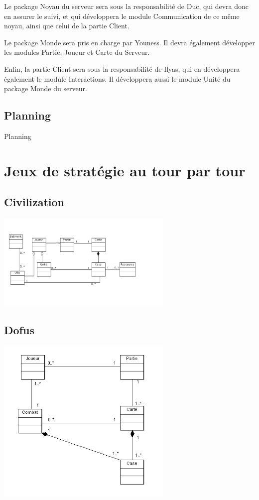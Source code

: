 \documentclass[a4paper,10pt]{report}
\begin{document}
      Le package Noyau du serveur sera sous la responsabilité de Duc, qui devra donc en assurer le suivi, et qui développera le module Communication de ce même noyau, ainsi que celui de la partie Client. 
      
      Le package Monde sera pris en charge par Youness. Il devra également développer les modules Partie, Joueur et Carte du Serveur. 
      
      Enfin, la partie Client sera sous la responsabilité de Ilyas, qui en développera également le module Interactions. Il développera aussi le module Unité du package Monde du serveur. 


    \section{Planning}

      Planning


\appendix

\chapter{Jeux de stratégie au tour par tour}

	\section{Civilization}

		\includegraphics[width=320px]{diagrammes/concept_civilization.png}


	\section{Dofus}
	
		\includegraphics[width=320px]{diagrammes/classdiagram_dofus.png}
     
\end{document}
